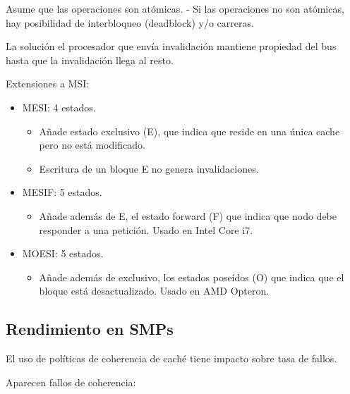 \documentclass[12pt, twoside, openright]{report} %
\begin{document}
Asume que las operaciones son atómicas. - Si las operaciones no
son atómicas, hay posibilidad de interbloqueo (deadblock) y/o
carreras.

La solución el procesador que envía invalidación mantiene
propiedad del bus hasta que la invalidación llega al resto.

Extensiones a MSI:

\begin{itemize}

	\item MESI: 4 estados.

	      \begin{itemize}

		      \item Añade estado exclusivo (E), que indica que reside en una única
		            cache pero no está modificado.
		      \item Escritura de un bloque E no genera invalidaciones.
	      \end{itemize}
	\item MESIF: 5 estados.

	      \begin{itemize}

		      \item Añade además de E, el estado forward (F) que indica que nodo
		            debe responder a una petición. Usado en Intel Core i7.
	      \end{itemize}
	\item MOESI: 5 estados.

	      \begin{itemize}

		      \item Añade además de exclusivo, los estados poseídos (O) que indica
		            que el bloque está desactualizado. Usado en AMD Opteron.
	      \end{itemize}
\end{itemize}

\subsection{Rendimiento en SMPs}


El uso de políticas de coherencia de caché tiene impacto sobre
tasa de fallos.

Aparecen fallos de coherencia:
\end{document}
